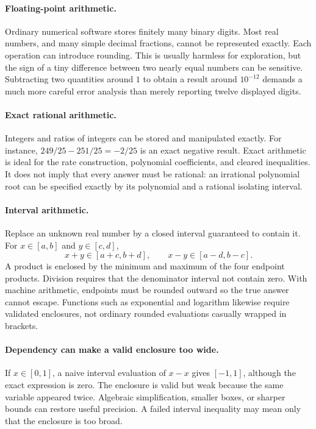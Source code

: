 \paragraph{Floating-point arithmetic.}
Ordinary numerical software stores finitely many binary digits. Most real
numbers, and many simple decimal fractions, cannot be represented exactly.
Each operation can introduce rounding. This is usually harmless for
exploration, but the sign of a tiny difference between two nearly equal
numbers can be sensitive. Subtracting two quantities around $1$ to obtain
a result around $10^{-12}$ demands a much more careful error analysis
than merely reporting twelve displayed digits.

\paragraph{Exact rational arithmetic.}
Integers and ratios of integers can be stored and manipulated exactly.
For instance,
$249/25-251/25=-2/25$ is an exact negative result. Exact arithmetic is ideal
for the rate construction, polynomial coefficients, and cleared inequalities.
It does not imply that every answer must be rational: an irrational
polynomial root can be specified exactly by its polynomial and a rational
isolating interval.

\paragraph{Interval arithmetic.}
Replace an unknown real number by a closed interval guaranteed to contain
it. For $x\in[a,b]$ and $y\in[c,d]$,
\[
x+y\in[a+c,b+d],\qquad x-y\in[a-d,b-c].
\]
A product is enclosed by the minimum and maximum of the four endpoint
products. Division requires that the denominator interval not contain zero.
With machine arithmetic, endpoints must be rounded outward so the true
answer cannot escape. Functions such as exponential and logarithm likewise
require validated enclosures, not ordinary rounded evaluations casually
wrapped in brackets.

\paragraph{Dependency can make a valid enclosure too wide.}
If $x\in[0,1]$, a naive interval evaluation of $x-x$ gives $[-1,1]$,
although the exact expression is zero. The enclosure is valid but weak
because the same variable appeared twice. Algebraic simplification,
smaller boxes, or sharper bounds can restore useful precision. A failed
interval inequality may mean only that the enclosure is too broad.

